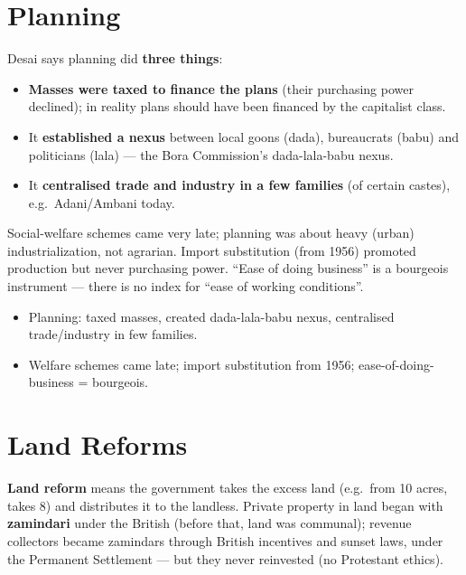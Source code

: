 \section{Planning}

Desai says planning did \textbf{three things}:
\begin{itemize}
\item \textbf{Masses were taxed to finance the plans} (their purchasing power declined); in reality plans should have been financed by the capitalist class.
\item It \textbf{established a nexus} between local goons (dada), bureaucrats (babu) and politicians (lala) --- the Bora Commission's dada-lala-babu nexus.
\item It \textbf{centralised trade and industry in a few families} (of certain castes), e.g.\ Adani/Ambani today.
\end{itemize}

\begin{CriticalPoint}
Social-welfare schemes came very late; planning was about heavy (urban) industrialization, not agrarian. Import substitution (from 1956) promoted production but never purchasing power. ``Ease of doing business'' is a bourgeois instrument --- there is no index for ``ease of working conditions''.
\end{CriticalPoint}

\begin{QuickRevision}
\begin{itemize}
\item Planning: taxed masses, created dada-lala-babu nexus, centralised trade/industry in few families.
\item Welfare schemes came late; import substitution from 1956; ease-of-doing-business = bourgeois.
\end{itemize}
\end{QuickRevision}

\section{Land Reforms}

\textbf{Land reform} means the government takes the excess land (e.g.\ from 10 acres, takes 8) and distributes it to the landless. Private property in land began with \textbf{zamindari} under the British (before that, land was communal); revenue collectors became zamindars through British incentives and sunset laws, under the Permanent Settlement --- but they never reinvested (no Protestant ethics).

